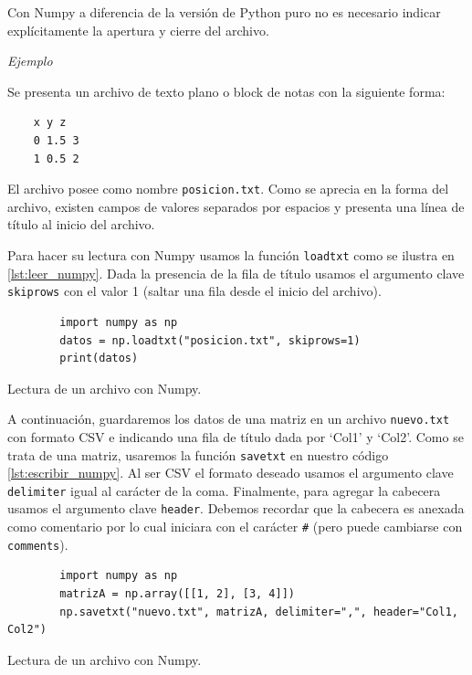 Con Numpy a diferencia de la versión de Python puro no es necesario indicar explícitamente la apertura y cierre
del archivo.

\textit{Ejemplo}

Se presenta un archivo de texto plano o block de notas con la siguiente forma:

\begin{listing}[H]
\begin{verbatim}
    x y z
    0 1.5 3
    1 0.5 2
\end{verbatim}
\end{listing}

El archivo posee como nombre \texttt{posicion.txt}. Como se aprecia en la forma del archivo,
existen campos de valores separados por espacios y presenta una línea de título al inicio del archivo.

Para hacer su lectura con Numpy usamos la función \texttt{loadtxt} como se ilustra en \ref{lst:leer_numpy}.
Dada la presencia de la fila de título usamos el argumento clave \texttt{skiprows} con el valor 1 (saltar
una fila desde el inicio del archivo).

\begin{listing}[H]
    \begin{verbatim}
        import numpy as np
        datos = np.loadtxt("posicion.txt", skiprows=1)
        print(datos)
    \end{verbatim}
    \caption{Lectura de un archivo con Numpy.}
    \label{lst:leer_numpy}
\end{listing}

A continuación, guardaremos los datos de una matriz en un archivo \texttt{nuevo.txt}
con formato CSV e indicando una fila de título dada por `Col1' y `Col2'. Como se trata de una matriz, usaremos la función \texttt{savetxt} en
nuestro código \ref{lst:escribir_numpy}. Al ser CSV el formato deseado usamos el argumento
clave \texttt{delimiter} igual al carácter de la coma. Finalmente, para agregar la cabecera usamos
el argumento clave \texttt{header}. Debemos recordar que la cabecera es anexada como comentario por lo cual iniciara
con el carácter \texttt{\#} (pero puede cambiarse con \texttt{comments}).

\begin{listing}[H]
    \begin{verbatim}
        import numpy as np
        matrizA = np.array([[1, 2], [3, 4]])
        np.savetxt("nuevo.txt", matrizA, delimiter=",", header="Col1, Col2")
    \end{verbatim}
    \caption{Lectura de un archivo con Numpy.}
    \label{lst:escribir_numpy}
\end{listing}


